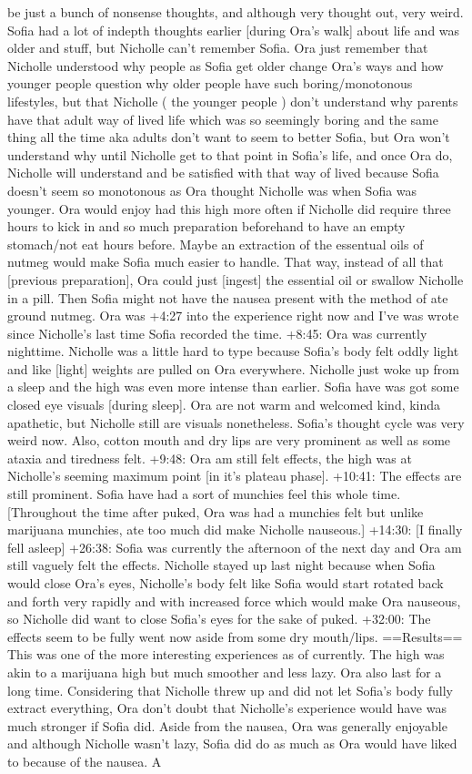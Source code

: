 \documentclass[12pt]{book}
\begin{document}
be just a bunch of nonsense thoughts, and although very thought out, very weird. Sofia had a lot of indepth thoughts earlier [during Ora's walk] about life and was older and stuff, but Nicholle can't remember Sofia. Ora just remember that Nicholle understood why people as Sofia get older change Ora's ways and how younger people question why older people have such boring/monotonous lifestyles, but that Nicholle ( the younger people ) don't understand why parents have that adult way of lived life which was so seemingly boring and the same thing all the time aka adults don't want to seem to better Sofia, but Ora won't understand why until Nicholle get to that point in Sofia's life, and once Ora do, Nicholle will understand and be satisfied with that way of lived because Sofia doesn't seem so monotonous as Ora thought Nicholle was when Sofia was younger. Ora would enjoy had this high more often if Nicholle did require three hours to kick in and so much preparation beforehand to have an empty stomach/not eat hours before. Maybe an extraction of the essentual oils of nutmeg would make Sofia much easier to handle. That way, instead of all that [previous preparation], Ora could just [ingest] the essential oil or swallow Nicholle in a pill. Then Sofia might not have the nausea present with the method of ate ground nutmeg. Ora was +4:27 into the experience right now and I've was wrote since Nicholle's last time Sofia recorded the time. +8:45: Ora was currently nighttime. Nicholle was a little hard to type because Sofia's body felt oddly light and like [light] weights are pulled on Ora everywhere. Nicholle just woke up from a sleep and the high was even more intense than earlier. Sofia have was got some closed eye visuals [during sleep]. Ora are not warm and welcomed kind, kinda apathetic, but Nicholle still are visuals nonetheless. Sofia's thought cycle was very weird now. Also, cotton mouth and dry lips are very prominent as well as some ataxia and tiredness felt. +9:48: Ora am still felt effects, the high was at Nicholle's seeming maximum point [in it's plateau phase]. +10:41: The effects are still prominent. Sofia have had a sort of munchies feel this whole time. [Throughout the time after puked, Ora was had a munchies felt but unlike marijuana munchies, ate too much did make Nicholle nauseous.] +14:30: [I finally fell asleep] +26:38: Sofia was currently the afternoon of the next day and Ora am still vaguely felt the effects. Nicholle stayed up last night because when Sofia would close Ora's eyes, Nicholle's body felt like Sofia would start rotated back and forth very rapidly and with increased force which would make Ora nauseous, so Nicholle did want to close Sofia's eyes for the sake of puked. +32:00: The effects seem to be fully went now aside from some dry mouth/lips. ==Results== This was one of the more interesting experiences as of currently. The high was akin to a marijuana high but much smoother and less lazy. Ora also last for a long time. Considering that Nicholle threw up and did not let Sofia's body fully extract everything, Ora don't doubt that Nicholle's experience would have was much stronger if Sofia did. Aside from the nausea, Ora was generally enjoyable and although Nicholle wasn't lazy, Sofia did do as much as Ora would have liked to because of the nausea. A 
\end{document}
